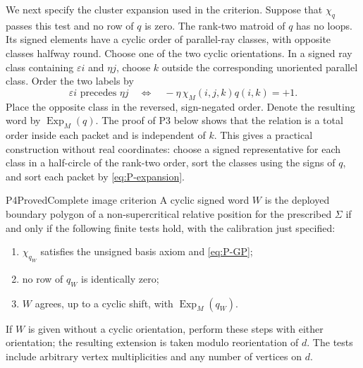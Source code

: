 We next specify the cluster expansion used in the criterion.  Suppose
that $\chi_q$ passes this test and no row of $q$ is zero.  The rank-two
matroid of $q$ has no loops.  Its signed elements have a cyclic order of
parallel-ray classes, with opposite classes halfway round.  Choose one
of the two cyclic orientations.  In a signed ray class containing
$\varepsilon i$ and $\eta j$, choose $k$ outside the corresponding
unoriented parallel class.  Order the two labels by
\begin{equation}
 \varepsilon i \text{ precedes }\eta j
 \quad\Longleftrightarrow\quad
 -\eta\,\chi_M(i,j,k)q(i,k)=+1.                         \label{eq:P-expansion}
\end{equation}
Place the opposite class in the reversed, sign-negated order.  Denote
the resulting word by $\operatorname{Exp}_M(q)$.  The proof of P3 below
shows that the relation is a total order inside each packet and is
independent of $k$.  This gives a practical construction without real
coordinates: choose a signed representative for each class in a
half-circle of the rank-two order, sort the classes using the signs of
$q$, and sort each packet by \eqref{eq:P-expansion}.

\begin{resultenv}{P4}{Proved}{Complete image criterion}
A cyclic signed word $W$ is the deployed boundary polygon of a
non-supercritical relative position for the prescribed $\Sigma$ if and
only if the following finite tests hold, with the calibration just
specified:
\begin{enumerate}
 \item $\chi_{q_W}$ satisfies the unsigned basis axiom and
       \eqref{eq:P-GP};
 \item no row of $q_W$ is identically zero;
 \item $W$ agrees, up to a cyclic shift, with
       $\operatorname{Exp}_M(q_W)$.
\end{enumerate}
If $W$ is given without a cyclic orientation, perform these steps with
either orientation; the resulting extension is taken modulo
reorientation of $d$.  The tests include arbitrary vertex
multiplicities and any number of vertices on $d$.
\end{resultenv}

